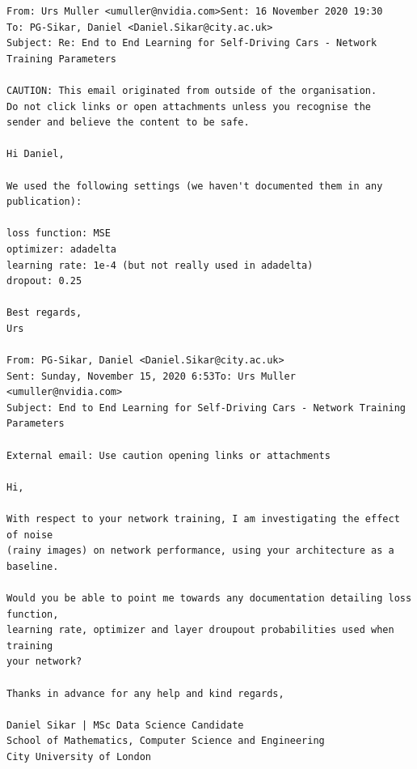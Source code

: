 \begin{verbatim}
From: Urs Muller <umuller@nvidia.com>Sent: 16 November 2020 19:30
To: PG-Sikar, Daniel <Daniel.Sikar@city.ac.uk>
Subject: Re: End to End Learning for Self-Driving Cars - Network Training Parameters

CAUTION: This email originated from outside of the organisation. 
Do not click links or open attachments unless you recognise the
sender and believe the content to be safe.

Hi Daniel,

We used the following settings (we haven't documented them in any publication):

loss function: MSE
optimizer: adadelta
learning rate: 1e-4 (but not really used in adadelta)
dropout: 0.25

Best regards,
Urs

From: PG-Sikar, Daniel <Daniel.Sikar@city.ac.uk>
Sent: Sunday, November 15, 2020 6:53To: Urs Muller <umuller@nvidia.com>
Subject: End to End Learning for Self-Driving Cars - Network Training Parameters
 
External email: Use caution opening links or attachments

Hi,

With respect to your network training, I am investigating the effect of noise 
(rainy images) on network performance, using your architecture as a baseline.

Would you be able to point me towards any documentation detailing loss function, 
learning rate, optimizer and layer droupout probabilities used when training 
your network?

Thanks in advance for any help and kind regards,

Daniel Sikar | MSc Data Science Candidate
School of Mathematics, Computer Science and Engineering
City University of London    
\end{verbatim}

